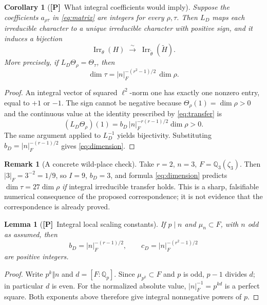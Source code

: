 \documentclass[11pt]{article}
\newcommand{\Irr}{\operatorname{Irr}}
\newcommand{\tH}{\widetilde H}
\newcommand{\Ptag}{\textnormal{\textbf{[P]}}}
\theoremstyle{plain}
\newtheorem{lemma}[theorem]{Lemma}
\newtheorem{corollary}[theorem]{Corollary}
\theoremstyle{definition}
\newtheorem{remark}[theorem]{Remark}
\begin{document}
\begin{corollary}[\Ptag\ What integral coefficients would imply]\label{cor:integrality}
Suppose the coefficients $a_{\rho\tau}$ in \eqref{eq:matrix} are integers for every $\rho,\tau$. Then $L_D$ maps each irreducible character to a unique irreducible character with positive sign, and it induces a bijection
\[
\Irr_\theta(H)\;\xrightarrow{\sim}\;\Irr_{\widetilde\theta}(\tH).
\]
More precisely, if $L_D\Theta_\rho=\Theta_\tau$, then
\begin{equation}\label{eq:dimension}
\boxed{\qquad\dim\tau=|n|_F^{-(r^2-1)/2}\,\dim\rho.\qquad}
\end{equation}
\end{corollary}
\begin{proof}
An integral vector of squared $\ell^2$-norm one has exactly one nonzero entry, equal to $+1$ or $-1$. The sign cannot be negative because $\Theta_\rho(1)=\dim\rho>0$ and the continuous value at the identity prescribed by \eqref{eq:transfer} is
\[
(L_D\Theta_\rho)(1)
=b_D\,|n|_F^{-r(r-1)/2}\dim\rho>0.
\]
The same argument applied to $L_D^{-1}$ yields bijectivity. Substituting $b_D=|n|_F^{-(r-1)/2}$ gives \eqref{eq:dimension}.
\end{proof}

\begin{remark}[A concrete wild-place check]
Take $r=2$, $n=3$, $F=\mathbb Q_3(\zeta_3)$. Then $|3|_F=3^{-2}=1/9$, so $I=9$, $b_D=3$, and formula \eqref{eq:dimension} predicts $\dim\tau=27\dim\rho$ \emph{if} integral irreducible transfer holds. This is a sharp, falsifiable numerical consequence of the proposed correspondence; it is not evidence that the correspondence is already proved.
\end{remark}


\begin{lemma}[\Ptag\ Integral local scaling constants]\label{lem:integral-constants}
If $p\mid n$ and $\mu_n\subset F$, with $n$ odd as assumed, then
\[
b_D=|n|_F^{-(r-1)/2},\qquad
c_D=|n|_F^{-(r^2-1)/2}
\]
are positive integers.
\end{lemma}
\begin{proof}
Write $p^k\Vert n$ and $d=[F:\mathbb Q_p]$. Since
$\mu_{p^k}\subset F$ and $p$ is odd, $p-1$ divides $d$;
in particular $d$ is even. For the normalized absolute value,
$|n|_F^{-1}=p^{kd}$ is a perfect square. Both exponents above
therefore give integral nonnegative powers of $p$.
\end{proof}
\end{document}
